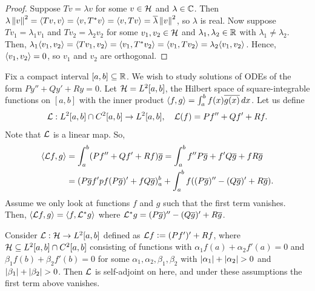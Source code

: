 \begin{proof}
    Suppose $Tv = \lambda v$ for some $v \in \mathcal{H}$ and $\lambda \in \mathbb{C}$. Then $\lambda \left\lVert v\right\rVert^{2} = \langle Tv,v\rangle = \langle v,T^{\ast} v\rangle = \langle v,T v\rangle = \overline{\lambda} \left\lVert v\right\rVert^{2}$, so $\lambda$ is real. Now suppose $Tv_{1} = \lambda_{1} v_{1}$ and $Tv_{2} = \lambda_{2} v_{2}$ for some $v_{1},v_{2} \in \mathcal{H}$ and $\lambda_{1},\lambda_{2} \in \mathbb{R}$ with $\lambda_{1} \neq \lambda_{2}$. Then, $\lambda_{1} \langle v_{1},v_{2}\rangle = \langle Tv_{1},v_{2}\rangle = \langle v_{1},T^{\ast} v_{2}\rangle = \langle v_{1},T v_{2}\rangle = \lambda_{2} \langle v_{1},v_{2}\rangle$. Hence, $\langle v_{1},v_{2}\rangle = 0$, so $v_{1}$ and $v_{2}$ are orthogonal.
\end{proof}

Fix a compact interval $[a,b] \subseteq \mathbb{R}$. We wish to study solutions of ODEs of the form $Py'' + Qy' + Ry = 0$. Let $\mathcal{H} = L^{2}[a,b]$, the Hilbert space of square-integrable functions on $[a,b]$ with the inner product $\langle f,g\rangle = \int_{a}^{b} f(x) \overline{g(x)} \, dx$. Let us define
\begin{align}
    \mathcal{L} : L^{2}[a,b] \cap C^{2}[a,b] \to L^{2}[a,b], \quad \mathcal{L}(f) = Pf'' + Qf' + Rf.
\end{align}
Note that $\mathcal{L}$ is a linear map. So,
\begin{align}
    \langle\mathcal{L} f, g\rangle &= \int_{a}^{b} (Pf'' + Qf' + Rf) \overline{g} = \int_{a}^{b} f'' P \overline{g} + f' Q \overline{g} + f R \overline{g} \notag \\ &= (P\overline{g} f'pf(P\overline{g})' + fQ\overline{g})_{a}^{b} + \int_{a}^{b} f ((P\overline{g})'' - (Q\overline{g})' + R \overline{g}).
\end{align}
Assume we only look at functions $f$ and $g$ such that the first term vanishes. Then, $\langle\mathcal{L} f, g\rangle = \langle f, \mathcal{L}^{\ast} g\rangle$ where $\mathcal{L}^{\ast} g = (P\overline{g})'' - (Q\overline{g})' + R \overline{g}$.


Consider $\mathcal{L} : \mathcal{H} \to L^{2}[a,b]$ defined as $\mathcal{L} f \vcentcolon= (Pf')' + Rf$, where $\mathcal{H} \subseteq L^{2}[a,b] \cap C^{2}[a,b]$ consisting of functions with $\alpha_{1} f(a) + \alpha_{2} f'(a) = 0$ and $\beta_{1} f(b) + \beta_{2} f'(b) = 0$ for some $\alpha_{1},\alpha_{2},\beta_{1},\beta_{2}$ with $\left| \alpha_{1} \right| + \left| \alpha_{2} \right| > 0$ and $\left| \beta_{1} \right| + \left| \beta_{2} \right| > 0$. Then $\mathcal{L}$ is self-adjoint on here, and under these assumptions the first term above vanishes.

